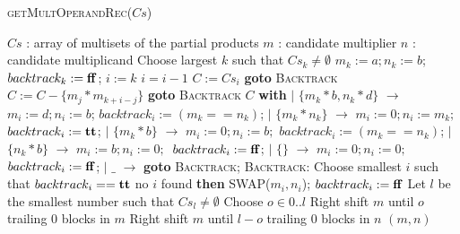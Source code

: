 \begin{algorithm}[t]
 \caption{\textsc{getMultOperandRec}($Cs$)}
 \label{alg:hb}
 \begin{algorithmic}[1]
   \Ensure $Cs$ : array of multisets of the partial products
   \State $m$ : candidate multiplier 
   \State $n$ : candidate multiplicand
   \State Choose largest $k$ such that $Cs_k\neq \emptyset$
   \State $m_k := a; n_k := b$; $backtrack_k := \mathbf{ff}$; 
   \Else
   \State {}
   \EndIf
   \State $i := k$
   \State $i = i - 1 $
   \State $C := Cs_i$
    {\bf goto }{\textsc{Backtrack}}
   \State $C := C - \{m_j*m_{k+i-j}\}$
   \EndIf
   \EndFor
    {\bf goto }{\textsc{Backtrack}}
    $C$ {\bf with}
   \State\quad $\mid$ $\{m_k*b,n_k*d\}$ $\rightarrow$ $m_i := d; n_i := b$;
   $backtrack_i := (m_k == n_k)$; 
   \State\quad $\mid$ $\{m_k*n_k\}$ $\rightarrow$ $m_i := 0; n_i := m_k;$
   $backtrack_i := \mathbf{tt}$; 
   \State \quad$\mid$ $\{m_k*b\}$ $\rightarrow$ $m_i := 0; n_i := b;$
   $backtrack_i := (m_k == n_k)$; 
   \State \quad $\mid$ $\{n_k*b\}$ $\rightarrow$ $m_i := b; n_i := 0;$\
   $backtrack_i := \mathbf{ff}$; 
   \State \quad $\mid$ $\{\}$ $\rightarrow$ $m_i := 0; n_i := 0;$\
   $backtrack_i := \mathbf{ff}$; 
   \State \quad $\mid$ $\_$ $\rightarrow$ {\bf goto }{\textsc{Backtrack}};
   \State {\bf continue;}
   \State \textsc{Backtrack:}
   \State \quad Choose smallest $i$ such that $backtrack_i == \mathbf{tt}$
   \State \quad {\bf if} no $i$ found {\bf then} 
   \State \quad \textsc{SWAP}($m_i,n_i$); $backtrack_i := \mathbf{ff}$
   \EndWhile
   \State Let $l$ be the smallest number such that $Cs_l\neq \emptyset$
   \State Choose $o \in 0..l$
   \State Right shift $m$ until $o$ trailing $0$ blocks in $m$
   \State Right shift $m$ until $l-o$ trailing $0$ blocks in $n$
   \State \Return $(m,n)$
 \end{algorithmic}
\end{algorithm}  


